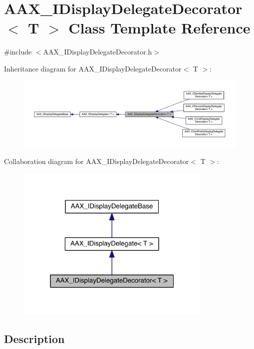 \hypertarget{a00094}{}\section{A\+A\+X\+\_\+\+I\+Display\+Delegate\+Decorator$<$ T $>$ Class Template Reference}
\label{a00094}


{\ttfamily \#include $<$A\+A\+X\+\_\+\+I\+Display\+Delegate\+Decorator.\+h$>$}



Inheritance diagram for A\+A\+X\+\_\+\+I\+Display\+Delegate\+Decorator$<$ T $>$\+:
\nopagebreak
\begin{figure}[H]
\begin{center}
\leavevmode
\includegraphics[width=350pt]{a00618}
\end{center}
\end{figure}


Collaboration diagram for A\+A\+X\+\_\+\+I\+Display\+Delegate\+Decorator$<$ T $>$\+:
\nopagebreak
\begin{figure}[H]
\begin{center}
\leavevmode
\includegraphics[width=265pt]{a00619}
\end{center}
\end{figure}


\subsection{Description}
